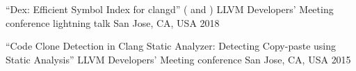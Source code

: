 
\begin{cventries}

  \cventry
    {``Dex: Efficient Symbol Index for clangd''
     ( and
      )}
    {LLVM Developers' Meeting conference lightning talk}
    {San Jose, CA, USA}
    {2018}
    {}

  \cventry
    {``Code Clone Detection in Clang Static Analyzer: Detecting Copy-paste using
     Static Analysis''}
    {LLVM Developers' Meeting conference
     }
    {San Jose, CA, USA}
    {2015}
    {}

\end{cventries}
